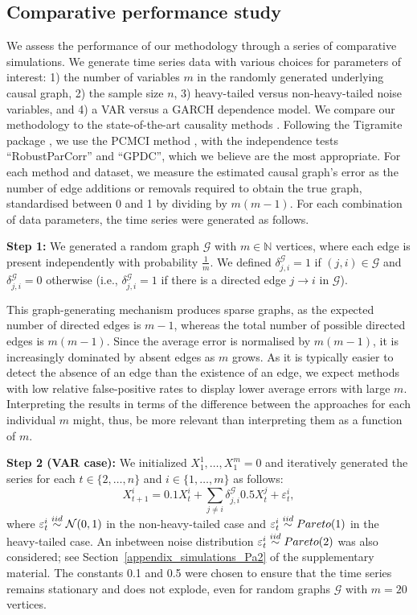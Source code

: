 \documentclass[a4paper,11pt]{article}
\newcommand{\toverset}[2]{\overset{{\rm #1}}{#2}}
\begin{document}
\subsection{Comparative performance study}
\label{Section_Sim_perform}

We assess the performance of our methodology through a series of comparative simulations. 
We generate time series data with various choices for parameters of interest: 1) the number of variables $m$ in the randomly generated underlying causal graph, 2) the sample size $n$, 3) heavy-tailed versus non-heavy-tailed noise variables, and 4) a VAR versus a GARCH dependence model. 
We compare our methodology to the state-of-the-art causality methods \citep{assaad2022survey}. Following the Tigramite package \citep{runge2023overview_causal}, we use the PCMCI method \citep{Runge2019PCMCI}, with the independence tests ``RobustParCorr'' and ``GPDC'', which we believe are the most appropriate. 
For each method and dataset, we measure the estimated causal graph's error as the number of edge additions or removals required to obtain the true graph, standardised between 0 and 1 by dividing by $m(m-1)$. 
For each combination of data parameters, the time series were generated as follows.

\textbf{Step 1:} We generated a random graph $\mathcal{G}$ with $m \in \mathbb{N}$ vertices, where each edge is present independently with probability $\frac{1}{m}$. We defined $\delta^{\mathcal{G}}_{j,i} = 1$ if $(j,i) \in \mathcal{G}$ and $\delta^{\mathcal{G}}_{j,i} = 0$ otherwise (i.e., $\delta^{\mathcal{G}}_{j,i} = 1$ if there is a directed edge $j \to i$ in $\mathcal{G}$).

This graph-generating mechanism produces sparse graphs, as the expected number of directed edges is \(m-1\), whereas the total number of possible directed edges is \(m(m-1)\). 
Since the average error is normalised by \(m(m-1)\), it is increasingly dominated by absent edges as \(m\) grows. 
As it is typically easier to detect the absence of an edge than the existence of an edge, we expect methods with low relative false-positive rates to display lower average errors with large $m$. 
Interpreting the results in terms of the difference between the approaches for each individual $m$ might, thus, be more relevant than interpreting them as a function of $m$.


\textbf{Step 2 (VAR case):} We initialized $X^1_1, \dots, X^m_1 = 0$ and iteratively generated the series for each $t \in \{2, \dots, n\}$ and $i \in \{1, \dots, m\}$ as follows:
\begin{equation*}
X_{t+1}^i = 0.1X_t^i + \sum_{j \neq i} \delta^{\mathcal{G}}_{j,i} 0.5 X_t^j + \varepsilon_t^i,
\end{equation*}
where $\varepsilon_t^i \toverset{iid}{\sim} \mathcal{N}(0,1)$ in the non-heavy-tailed case and $\varepsilon_t^i \toverset{iid}{\sim} {\rm Pareto}(1)$ in the heavy-tailed case. 
An inbetween noise distribution $\varepsilon_t^i \toverset{iid}{\sim} {\rm Pareto}(2)$ was also considered; see Section~\ref{appendix_simulations_Pa2} of the supplementary material.
The constants 0.1 and 0.5 were chosen to ensure that the time series remains stationary and does not explode, even for random graphs $\mathcal{G}$ with $m=20$ vertices.
\end{document}
